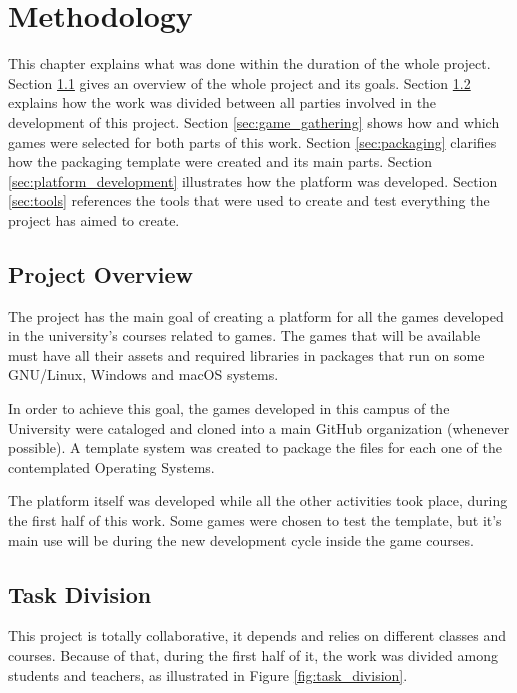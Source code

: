 \chapter{Methodology}
\label{sec:methodology}

This chapter explains what was done within the duration of the whole project. Section \ref{sec:project_overview} gives an overview of the whole project and its goals. Section \ref{sec:task_division} explains how the work was divided between all parties involved in the development of this project. Section \ref{sec:game_gathering} shows how and which games were selected for both parts of this work. Section \ref{sec:packaging} clarifies how the packaging template were created and its main parts. Section \ref{sec:platform_development} illustrates how the platform was developed. Section \ref{sec:tools} references the tools that were used to create and test everything the project has aimed to create.

\section{Project Overview}
\label{sec:project_overview}

The project has the main goal of creating a platform for all the games developed in the university's courses related to games. The games that will be available must have all their assets and required libraries in packages that run on some GNU/Linux, Windows and macOS systems.

In order to achieve this goal, the games developed in this campus of the University were cataloged and cloned into a main GitHub organization (whenever possible). A template system was created to package the files for each one of the contemplated Operating Systems.

The platform itself was developed while all the other activities took place, during the first half of this work. Some games were chosen to test the template, but it's main use will be during the new development cycle inside the game courses.

\section{Task Division}
\label{sec:task_division}

This project is totally collaborative, it depends and relies on different classes and courses. Because of that, during the first half of it, the work was divided among students and teachers, as illustrated in Figure \ref{fig:task_division}.

